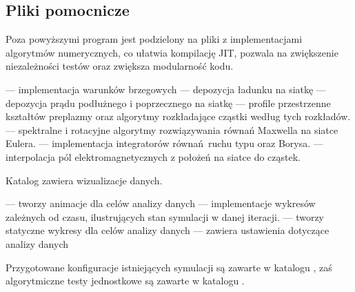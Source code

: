 \subsection{Pliki pomocnicze}
Poza powyższymi program jest podzielony na pliki z implementacjami algorytmów numerycznych,
co ułatwia kompilację JIT, pozwala na zwiększenie niezależności testów oraz
zwiększa modularność kodu.
\begin{itemize}
    \itemi{}  --- implementacja warunków brzegowych
    \itemi{}  --- depozycja ładunku na siatkę
    \itemi{}  --- depozycja prądu podłużnego i poprzecznego na siatkę
    \itemi{}  --- profile przestrzenne kształtów preplazmy
        oraz algorytmy rozkładające cząstki według tych rozkładów.
    \itemi{}  --- spektralne i rotacyjne algorytmy rozwiązywania równań Maxwella na siatce Eulera.
    \itemi{}  --- implementacja integratorów równań ruchu typu  oraz Borysa.
    \itemi{}  --- interpolacja pól elektromagnetycznych z położeń na siatce do cząstek.
\end{itemize}

Katalog  zawiera wizualizacje danych.
\begin{itemize}
    \itemi{}  --- tworzy animacje dla celów analizy danych
    \itemi{}  --- implementacje wykresów zależnych od czasu, ilustrujących stan symulacji w danej iteracji.
    \itemi{}  --- tworzy statyczne wykresy dla celów analizy danych
    \itemi{}  --- zawiera ustawienia dotyczące analizy danych
\end{itemize}

Przygotowane konfiguracje istniejących symulacji są zawarte w katalogu 
, zaś algorytmiczne testy jednostkowe są zawarte w katalogu .

